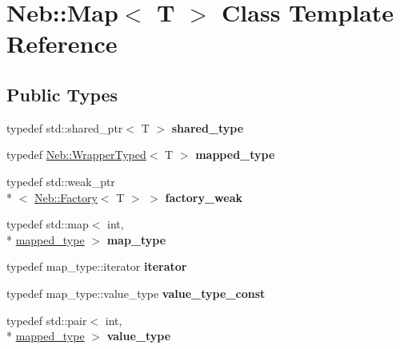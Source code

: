 \hypertarget{classNeb_1_1Map}{\section{Neb\-:\-:Map$<$ T $>$ Class Template Reference}
\label{classNeb_1_1Map}
}
\subsection*{Public Types}
\begin{DoxyCompactItemize}
\item 
\hypertarget{classNeb_1_1Map_a6810d118b98686c87dbd11fb46549e10}{typedef std\-::shared\-\_\-ptr$<$ T $>$ {\bfseries shared\-\_\-type}}\label{classNeb_1_1Map_a6810d118b98686c87dbd11fb46549e10}

\item 
\hypertarget{classNeb_1_1Map_ac47c5fb9744284a4b6644f7850040095}{typedef \hyperlink{classNeb_1_1WrapperTyped}{Neb\-::\-Wrapper\-Typed}$<$ T $>$ {\bfseries mapped\-\_\-type}}\label{classNeb_1_1Map_ac47c5fb9744284a4b6644f7850040095}

\item 
\hypertarget{classNeb_1_1Map_a833c7da4ecc80e82f0697466fcb6aa96}{typedef std\-::weak\-\_\-ptr\\*
$<$ \hyperlink{classNeb_1_1Factory}{Neb\-::\-Factory}$<$ T $>$ $>$ {\bfseries factory\-\_\-weak}}\label{classNeb_1_1Map_a833c7da4ecc80e82f0697466fcb6aa96}

\item 
\hypertarget{classNeb_1_1Map_aff92d7127de1554a67d6c668f99c1f8e}{typedef std\-::map$<$ int, \\*
\hyperlink{classNeb_1_1WrapperTyped}{mapped\-\_\-type} $>$ {\bfseries map\-\_\-type}}\label{classNeb_1_1Map_aff92d7127de1554a67d6c668f99c1f8e}

\item 
\hypertarget{classNeb_1_1Map_ad2414c63c11316575065264c75670475}{typedef map\-\_\-type\-::iterator {\bfseries iterator}}\label{classNeb_1_1Map_ad2414c63c11316575065264c75670475}

\item 
\hypertarget{classNeb_1_1Map_a9beb63846e033e9650dd4d3f2fb1eb2c}{typedef map\-\_\-type\-::value\-\_\-type {\bfseries value\-\_\-type\-\_\-const}}\label{classNeb_1_1Map_a9beb63846e033e9650dd4d3f2fb1eb2c}

\item 
\hypertarget{classNeb_1_1Map_a6fab819e1d3f93075362c71f2c69d8ca}{typedef std\-::pair$<$ int, \\*
\hyperlink{classNeb_1_1WrapperTyped}{mapped\-\_\-type} $>$ {\bfseries value\-\_\-type}}\label{classNeb_1_1Map_a6fab819e1d3f93075362c71f2c69d8ca}

\end{DoxyCompactItemize}
